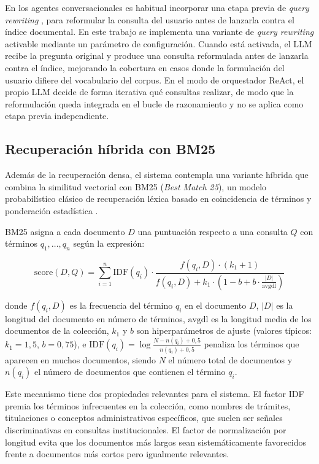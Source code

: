 En los agentes conversacionales es habitual incorporar una etapa previa de \textit{query rewriting} \cite{ma2023queryrewriting}, para reformular la consulta del usuario antes de lanzarla contra el índice documental.
En este trabajo se implementa una variante de \textit{query rewriting} activable mediante un parámetro de configuración.
Cuando está activada, el LLM recibe la pregunta original y produce una consulta reformulada antes de lanzarla contra el índice, mejorando la cobertura en casos donde la formulación del usuario difiere del vocabulario del corpus.
En el modo de orquestador ReAct, el propio LLM decide de forma iterativa qué consultas realizar, de modo que la reformulación queda integrada en el bucle de razonamiento y no se aplica como etapa previa independiente.

\subsection{Recuperación híbrida con BM25}\label{subsec:recuperacion-hibrida}

Además de la recuperación densa, el sistema contempla una variante híbrida que combina la similitud vectorial con BM25 (\textit{Best Match 25}), un modelo probabilístico clásico de recuperación léxica basado en coincidencia de términos y ponderación estadística \cite{robertson2009bm25}.

BM25 asigna a cada documento $D$ una puntuación respecto a una consulta $Q$ con términos $q_1, \ldots, q_n$ según la expresión:

\begin{equation}
\text{score}(D, Q) = \sum_{i=1}^{n} \text{IDF}(q_i) \cdot \frac{f(q_i, D) \cdot (k_1 + 1)}{f(q_i, D) + k_1 \cdot \left(1 - b + b \cdot \frac{|D|}{\text{avgdl}}\right)}
\label{eq:bm25}
\end{equation}

donde $f(q_i, D)$ es la frecuencia del término $q_i$ en el documento $D$, $|D|$ es la longitud del documento en número de términos, $\text{avgdl}$ es la longitud media de los documentos de la colección, $k_1$ y $b$ son hiperparámetros de ajuste (valores típicos: $k_1 = 1{,}5$, $b = 0{,}75$), e $\text{IDF}(q_i) = \log\frac{N - n(q_i) + 0{,}5}{n(q_i) + 0{,}5}$ penaliza los términos que aparecen en muchos documentos, siendo $N$ el número total de documentos y $n(q_i)$ el número de documentos que contienen el término $q_i$.

Este mecanismo tiene dos propiedades relevantes para el sistema. 
El factor IDF premia los términos infrecuentes en la colección, como nombres de trámites, titulaciones o conceptos administrativos específicos, que suelen ser señales discriminativas en consultas institucionales. 
El factor de normalización por longitud evita que los documentos más largos sean sistemáticamente favorecidos frente a documentos más cortos pero igualmente relevantes.

